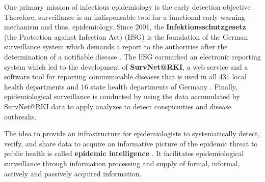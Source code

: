   One primary mission of infectious epidemiology is the early detection objective \citep{EarlyDetection}.
  Therefore, surveillance is an indispensable tool for a functional early warning mechanism and thus, epidemiology.
  Since 2001, the \textbf{Infektionsschutzgesetz} (the Protection against Infection Act) (\gls{IfSG})
  is the foundation of the German surveillance system which demands a report to the authorities after the determination of a notifiable disease \citep{IfSG}.
  The IfSG earmarked an electronic reporting system which led to the development of \textbf{SurvNet@RKI}, a web service and a software tool for reporting communicable diseases that is used in all 431 local health departments and 16 state health departments of Germany \citep{Faensen2006}.
  Finally, epidemiological surveillance is conducted by using the data accumulated by SurvNet@RKI data to apply analyzes to detect conspicuities and disease outbreaks.

  The idea to provide an infrastructure for epidemiologists to systematically detect, verify, and share data to acquire an informative picture of the epidemic threat to public health is called \textbf{epidemic intelligence} \citep{EarlyDetection}.
  It facilitates epidemiological surveillance through information processing and supply of formal, informal, actively and passively acquired information.

